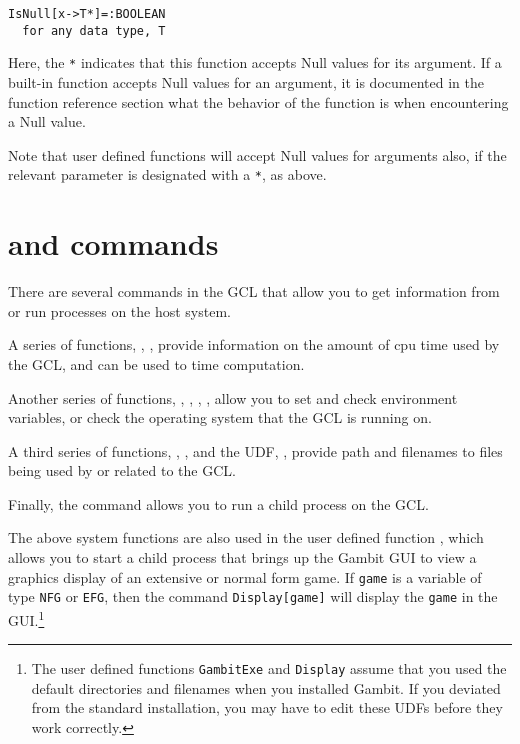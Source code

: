 \begin{verbatim}
IsNull[x->T*]=:BOOLEAN
  for any data type, T
\end{verbatim}

Here, the \verb+*+ indicates that this function accepts Null values
for its argument.  If a built-in function accepts Null values for an
argument, it is documented in the function reference section what the
behavior of the function is when encountering a Null value.  

Note that user defined functions  will accept Null values for
arguments also, if the relevant parameter is designated with a
\verb+*+, as above. 

\section{ and commands}

There are several commands in the GCL that allow you to get
information from or run processes on the host system.  

A series of functions, , ,
 provide information on the amount of cpu time
used by the GCL, and can be used to time computation.  

Another series of functions, , ,
, , allow you to set and check
environment variables, or check the operating system that the GCL is
running on.

A third series of functions, , , and the
UDF, , provide path and filenames to files being used
by or related to the GCL.

Finally, the  command allows you to run a child process on
the GCL.  

The above system functions are also used in the user defined function
, which allows you to start a child process that brings
up the Gambit GUI to view a graphics display of an extensive or normal
form game. If \verb+game+ is a variable of type \verb+NFG+ or
\verb+EFG+, then the command \verb+Display[game]+ will display the
\verb+game+ in the GUI.\footnote{The user defined functions
{\tt GambitExe} and {\tt Display} assume that you used the default
directories and filenames when you installed Gambit.  If you deviated
from the standard installation, you may have to edit these UDFs
before they work correctly.}

